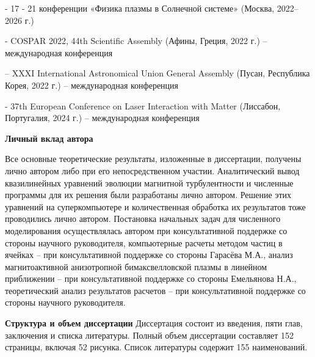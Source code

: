 - 17 - 21 конференции «Физика плазмы в Солнечной системе» (Москва, 2022–2026 г.)

- COSPAR 2022, 44th Scientific Assembly (Афины, Греция, 2022 г.) – международная конференция 

– XXXI International Astronomical Union General Assembly (Пусан, Республика Корея, 2022 г.) – международная конференция 

- 37th European Conference on Laser Interaction with Matter (Лиссабон, Португалия, 2024 г.) – международная конференция 

{\bfseries Личный вклад автора}

Все основные теоретические результаты, изложенные в диссертации, получены лично автором либо при его непосредственном участии. Аналитический вывод квазилинейных уравнений эволюции магнитной турбулентности и численные программы для их решения были разработаны лично автором. Решение этих уравнений на суперкомпьютере и количественная обработка их результатов тоже проводились лично автором. Постановка начальных задач для численного моделирования осуществлялась автором при консультативной поддержке со стороны научного руководителя, компьютерные расчеты методом частиц в ячейках -- при консультативной поддержке со стороны Гарасёва М.А., анализ магнитоактивной анизотропной бимаксвелловской плазмы в линейном приближении -- при консультативной поддержке со стороны Емельянова Н.А., теоретический анализ результатов расчетов -- при консультативной поддержке со стороны научного руководителя.

{\bfseries Структура и объем диссертации}
Диссертация состоит из введения, пяти глав, заключения и списка литературы. Полный объем диссертации составляет 152 страницы, включая 52 рисунка.
Список литературы содержит 155 наименований.
